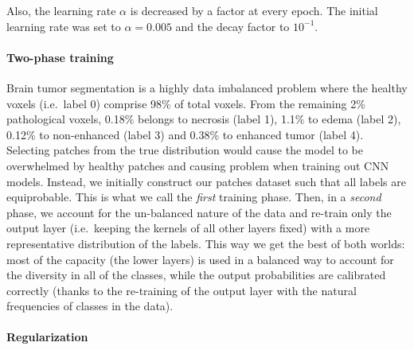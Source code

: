 \documentclass[final,5p,times,twocolumn]{elsarticle}
\begin{document}
Also, the learning rate $\alpha$ is decreased by a factor at every epoch. The initial learning rate was set to $\alpha=0.005$ and the decay factor to $10^{-1}$. 







\paragraph{Two-phase training}

\label{twopahsetraining}

Brain tumor segmentation is a highly data imbalanced problem where the healthy voxels (i.e.\ label 0) comprise 98\% of total voxels. From the remaining 2\% pathological voxels,  0.18\% belongs to necrosis (label 1), 1.1\% to edema (label 2), 0.12\% to non-enhanced (label 3) and 0.38\% to enhanced tumor (label 4). Selecting patches from the true distribution would cause the model to be overwhelmed by healthy patches and causing problem when training out CNN models. Instead, we initially construct our patches dataset such that all labels are equiprobable. This is what we call the {\em first} training phase.  Then, in a {\em second} phase, we  account for the un-balanced nature of the data and re-train only the output layer (i.e.\ keeping the kernels of all other layers fixed) with a more representative distribution of the labels. This way we get the best of both worlds: most of the capacity (the lower layers) is used in a balanced way to account for the diversity in all of the classes, while the output probabilities are calibrated correctly (thanks to the re-training of the output layer with the natural frequencies of classes in the data).



\paragraph{Regularization}
\end{document}
